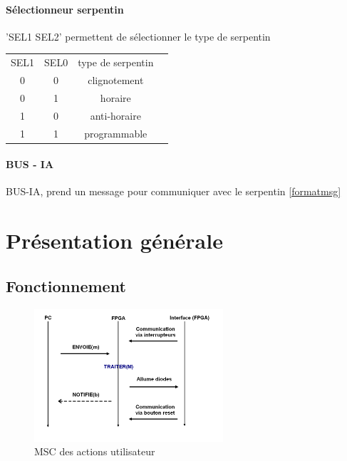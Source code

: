 \documentclass[10pt]{article}
\begin{document}
    \paragraph{Sélectionneur serpentin} 'SEL1 SEL2' permettent de sélectionner le type de serpentin
    
    \begin{table}[h]
        \centering
        \begin{tabular}{cccc}
                SEL1 & SEL0 & type de serpentin \\
                  0  &   0  &    clignotement   \\
                  0  &   1  &    horaire        \\
                  1  &   0  &    anti-horaire   \\
                  1  &   1  &    programmable   \\
        \end{tabular}
    \end{table}
        
        
    \paragraph{BUS - IA} BUS-IA, prend un message pour communiquer avec le serpentin \ref{formatmsg}

    \newpage
    \section{Présentation générale}
    
        \subsection{Fonctionnement}
        \begin{figure}[h!]
            \includegraphics[width=7cm]{fonctionnement.png}
            \caption{MSC des actions utilisateur}
        \end{figure}
        
\end{document}
